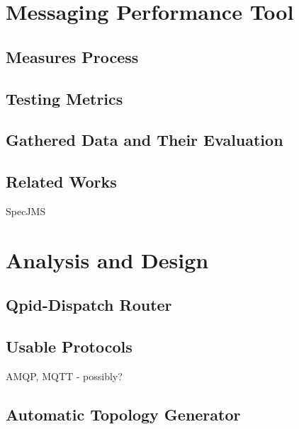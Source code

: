 \chapter{Messaging Performance Tool}
\label{Messaging Performance Tool}


\section{Measures Process}
\label{Measures Process}

\section{Testing Metrics}
\label{Testing Metrics}

\section{Gathered Data and Their Evaluation}
\label{Gathered Data and Their Evaluation}

\section{Related Works}
\label{Related Works}

SpecJMS

\chapter{Analysis and Design}
\label{Analysis and Design}

\section{Qpid-Dispatch Router}

\section{Usable Protocols}
AMQP, MQTT - possibly?

\section{Automatic Topology Generator}

